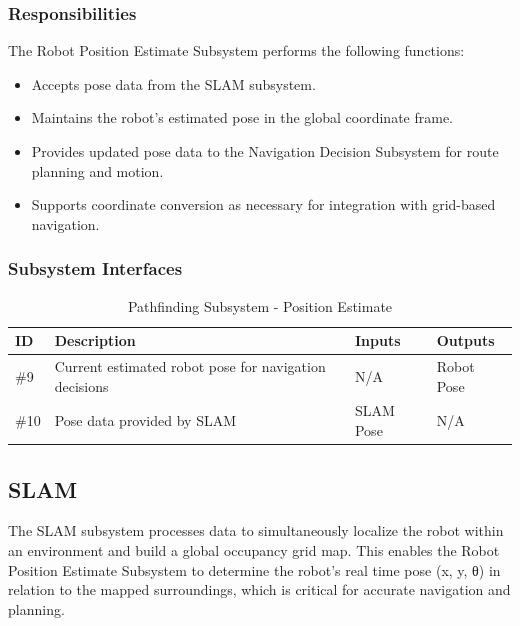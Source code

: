 \subsubsection{Responsibilities}

The Robot Position Estimate Subsystem performs the following functions:
\begin{itemize}
  \item Accepts pose data from the SLAM subsystem.
  \item Maintains the robot’s estimated pose in the global coordinate frame.
  \item Provides updated pose data to the Navigation Decision Subsystem for route planning and motion.
  \item Supports coordinate conversion as necessary for integration with grid-based navigation.
\end{itemize}

\subsubsection{Subsystem Interfaces}

\begin{table}[H]
\caption{Pathfinding Subsystem - Position Estimate}
\begin{center}
    \begin{tabular}{ | p{1.5cm} | p{6cm} | p{3cm} | p{3cm} |}
    \hline
    ID & Description & Inputs & Outputs \\ \hline
    \#9  & Current estimated robot pose for navigation decisions & N/A & Robot Pose\\ \hline
    \#10 & Pose data provided by SLAM & SLAM Pose & N/A \\ \hline
    \end{tabular}
\end{center}
\end{table}

\newpage






\subsection{SLAM}
The SLAM subsystem processes data to simultaneously localize the robot within an environment and build a global occupancy grid map. This enables the Robot Position Estimate Subsystem to determine the robot's real time pose (x, y, θ) in relation to the mapped surroundings, which is critical for accurate navigation and planning.


